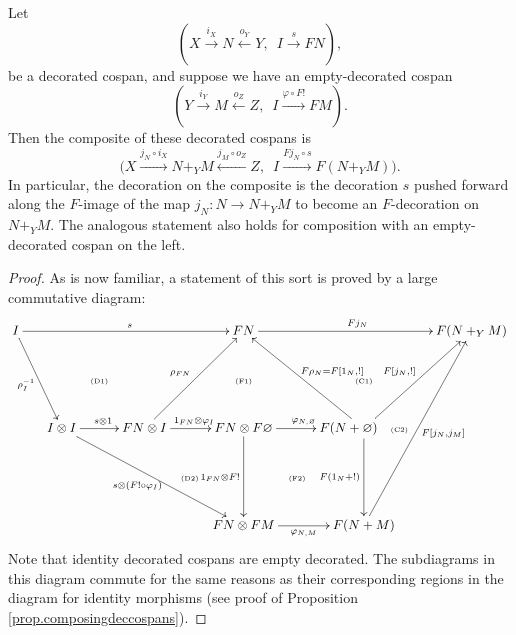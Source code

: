 \begin{lemma} \label{lem.emptydecorations}
  Let
\[
  (X \stackrel{i_X}\longrightarrow N
\stackrel{o_Y}\longleftarrow Y,\enspace I \stackrel{s}\longrightarrow FN),
\]
be a decorated cospan, and suppose we have an empty-decorated cospan 
\[
  (Y \stackrel{i_Y}\longrightarrow M \stackrel{o_Z}\longleftarrow Z,\enspace I
  \stackrel{\varphi\circ F!}\longrightarrow FM).
\]
Then the composite of these decorated cospans is 
\[
  \big(X \xrightarrow{j_N \circ i_X} N+_YM \xleftarrow{j_M \circ o_Z} Z,\enspace 
  I \xrightarrow{Fj_N \circ s} F(N+_YM)\big).
\]
In particular, the decoration on the composite is the decoration $s$ pushed
forward along the $F$-image of the map $j_N\colon N \to N+_YM$ to become an
$F$-decoration on $N+_YM$. The analogous statement also holds for composition
with an empty-decorated cospan on the left.
\end{lemma}
\begin{proof}
As is now familiar, a statement of this sort is proved by a large commutative
diagram:
\[
  \xymatrixcolsep{.4pc}
  \xymatrix{
    I \ar[rrrrrr]^s \ar[ddrr]_{\rho_I^{-1}} &&&&&& FN \ar[rrrr]^{Fj_N} &&&& F(N+_YM) \\
    &&& \textrm{\tiny(D1)} &&& \textrm{\tiny(F1)} && \textrm{\tiny(C1)} \\
    && I \otimes I \ar[rr]^{s\otimes 1} \ar[ddrrrr]_{s \otimes (F! \circ
    \varphi_I)} && FN \otimes I \ar[uurr]^{\rho_{FN}} \ar[rr]^{1_{FN}
  \otimes \varphi_I}
    && FN \otimes F\varnothing \ar[rr]^{\varphi_{N,\varnothing}} \ar[dd]_{1_{FN}
  \otimes F!} && F(N+\varnothing) \ar[uull]_{F\rho_N=F[1_N,!]}
  \ar[uurr]^{F[j_N,!]}
      \ar[dd]_{F(1_N+!)} \quad \textrm{\tiny(C2)}\\
      &&&&& \textrm{\tiny(D2)} && \textrm{\tiny(F2)}\\
      &&&&&& FN \otimes FM \ar[rr]_{\varphi_{N,M}} && F(N+M)
      \ar[uuuurr]_{F[j_N,j_M]}
  }
\]
Note that identity decorated cospans are empty decorated. The subdiagrams in
this diagram commute for the same reasons as their corresponding regions in the
diagram for identity morphisms (see proof of Proposition
\ref{prop.composingdeccospans}). 
\end{proof}

